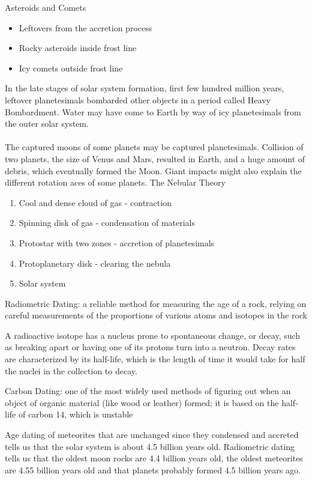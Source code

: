 \documentclass[12pt]{article}
\begin{document}
Asteroids and Comets \begin{itemize} 
\item Leftovers from the accretion process 
\item Rocky asteroids inside frost line 
\item Icy comets outside frost line \end{itemize} 
In the late stages of solar system formation, first few hundred million years, leftover planetesimals bombarded other objects in a period called Heavy Bombardment. Water may have come to Earth by way of icy planetesimals from the outer solar system. \\~\\
The captured moons of some planets may be captured planetesimals. Collision of two planets, the size of Venus and Mars, resulted in Earth, and a huge amount of debris, which eventually formed the Moon. Giant impacts might also explain the different rotation aces of some planets. \newpage
The Nebular Theory \begin{enumerate} 
\item Cool and dense cloud of gas - contraction 
\item Spinning disk of gas - condensation of materials 
\item Protostar with two zones - accretion of planetesimals 
\item Protoplanetary disk - clearing the nebula 
\item Solar system \end{enumerate} 
\begin{definition} Radiometric Dating: a reliable method for measuring the age of a rock, relying on careful measurements of the proportions of various atoms and isotopes in the rock \end{definition}
A radioactive isotope has a nucleus prone to spontaneous change, or decay, such as breaking apart or having one of its protons turn into a neutron. Decay rates are characterized by its half-life, which is the length of time it would take for half the nuclei in the collection to decay. 
\begin{definition} Carbon Dating: one of the most widely used methods of figuring out when an object of organic material (like wood or leather) formed; it is based on the half-life of carbon 14, which is unstable \end{definition} 
Age dating of meteorites that are unchanged since they condensed and accreted tells us that the solar system is about 4.5 billion years old. Radiometric dating tells us that the oldest moon rocks are 4.4 billion years old, the oldest meteorites are 4.55 billion years old and that planets probably formed 4.5 billion years ago. 
\end{document}
